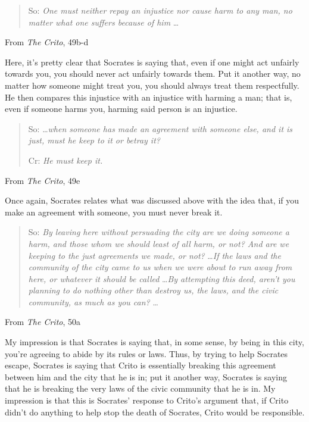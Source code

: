 \documentclass[letterpaper]{article}
\begin{document}
\begin{itemize}
\begin{mdframed}[]
\begin{quotation}
            So: \emph{One must neither repay an injustice nor cause harm to any man, no matter what one suffers because of him} \dots
        \end{quotation}
        From \emph{The Crito}, 49b-d
    \end{mdframed}
    Here, it's pretty clear that Socrates is saying that, even if one might act unfairly towards you, you should never act unfairly towards them. Put it another way, no matter how someone might treat you, you should always treat them respectfully. He then compares this injustice with an injustice with harming a man; that is, even if someone harms you, harming said person is an injustice. 

    \begin{mdframed}[]
        \begin{quotation}
            So: \dots \emph{when someone has made an agreement with someone else, and it is just, must he keep to it or betray it?}

            Cr: \emph{He must keep it.}
        \end{quotation}
        From \emph{The Crito}, 49e
    \end{mdframed}
    Once again, Socrates relates what was discussed above with the idea that, if you make an agreement with someone, you must never break it. 

    \begin{mdframed}[]
        \begin{quotation}
            So: \emph{By leaving here without persuading the city are we doing someone a harm, and those whom we should least of all harm, or not? And are we keeping to the just agreements we made, or not?} \dots \emph{If the laws and the community of the city came to us when we were about to run away from here, or whatever it should be called} \dots \emph{By attempting this deed, aren't you planning to do nothing other than destroy us, the laws, and the civic community, as much as you can?} \dots
        \end{quotation}
        From \emph{The Crito}, 50a
    \end{mdframed}
    My impression is that Socrates is saying that, in some sense, by being in this city, you're agreeing to abide by its rules or laws. Thus, by trying to help Socrates escape, Socrates is saying that Crito is essentially breaking this agreement between him and the city that he is in; put it another way, Socrates is saying that he is breaking the very laws of the civic community that he is in. My impression is that this is Socrates' response to Crito's argument that, if Crito didn't do anything to help stop the death of Socrates, Crito would be responsible. 
\end{itemize}
\end{document}
